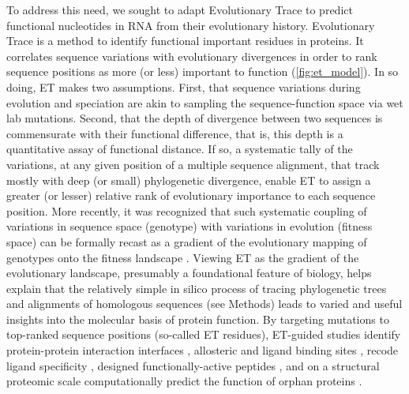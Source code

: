 \documentclass[12pt,a4paper]{report}
\begin{document}
To address this need, we sought to adapt Evolutionary Trace \cite{Lichtarge1996, Mihalek2004} to predict functional nucleotides in RNA from their evolutionary history. Evolutionary Trace is a method to identify functional important residues in proteins. It correlates sequence variations with evolutionary divergences in order to rank sequence positions as more (or less) important to function (\ref{fig:et_model}). In so doing, ET makes two assumptions. First, that sequence variations during evolution and speciation are akin to sampling the sequence-function space via wet lab mutations. Second, that the depth of divergence between two sequences is commensurate with their functional difference, that is, this depth is a quantitative assay of functional distance. If so, a systematic tally of the variations, at any given position of a multiple sequence alignment, that track mostly with deep (or small) phylogenetic divergence, enable ET to assign a greater (or lesser) relative rank of evolutionary importance to each sequence position. More recently, it was recognized that such systematic coupling of variations in sequence space (genotype) with variations in evolution (fitness space) can be formally recast as a gradient of the evolutionary mapping of genotypes onto the fitness landscape \cite{Katsonis2014}. Viewing ET as the gradient of the evolutionary landscape, presumably a foundational feature of biology, helps explain that the relatively simple in silico process of tracing phylogenetic trees and alignments of homologous sequences (see Methods) leads to varied and useful insights into the molecular basis of protein function. By targeting mutations to top-ranked sequence positions (so-called ET residues), ET-guided studies identify protein-protein interaction interfaces \cite{Lichtarge2003, Rajagopalan2006, Res2005}, allosteric \cite{Rodriguez2010} and ligand binding sites \cite{Raviscioni2006}, recode ligand specificity \cite{Rodriguez2010}, designed functionally-active peptides \cite{Gu2005}, and on a structural proteomic scale computationally predict the function of orphan proteins \cite{Erdin2013, Kristensen2008}. 



\end{document}

